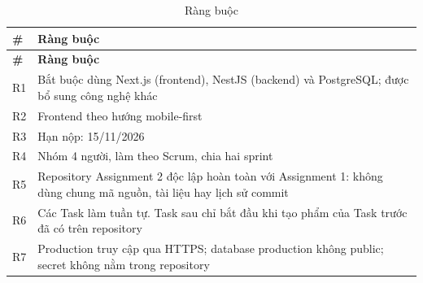 {\small
\begin{longtable}{@{}L{1cm}L{12.9cm}@{}}
\caption{Ràng buộc}\label{tab:rangbuoc}\\
\toprule
\textbf{\#} & \textbf{Ràng buộc} \\ \midrule \endfirsthead
\toprule \textbf{\#} & \textbf{Ràng buộc} \\ \midrule \endhead
\bottomrule \endfoot
R1 & Bắt buộc dùng Next.js (frontend), NestJS (backend) và PostgreSQL; được bổ sung công nghệ khác \\
R2 & Frontend theo hướng mobile-first \\
R3 & Hạn nộp: 15/11/2026 \\
R4 & Nhóm 4 người, làm theo Scrum, chia hai sprint \\
R5 & Repository Assignment 2 độc lập hoàn toàn với Assignment 1: không dùng chung mã nguồn, tài liệu hay lịch sử commit \\
R6 & Các Task làm tuần tự. Task sau chỉ bắt đầu khi tạo phẩm của Task trước đã có trên repository \\
R7 & Production truy cập qua HTTPS; database production không public; secret không nằm trong repository \\
\end{longtable}
}
